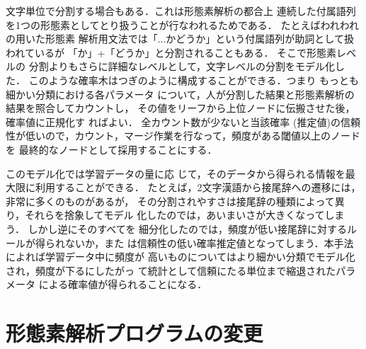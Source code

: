 文字単位で分割する場合もある．これは形態素解析の都合上
連続した付属語列を1つの形態素としてとり扱うことが行なわれるためである．
たとえばわれわれの用いた形態素
解析用文法では「...かどうか」という付属語列が助詞として扱われているが
「か」+「どうか」と分割されることもある．
そこで形態素レベルの
分割よりもさらに詳細なレベルとして，文字レベルの分割をモデル化した．
このような確率木はつぎのように構成することができる．つまり
もっとも細かい分類における各パラメータ
について，人が分割した結果と形態素解析の結果を照合してカウントし，
その値をリーフから上位ノードに伝搬させた後，確率値に正規化す
ればよい．
全カウント数が少ないと当該確率 (推定値)の信頼
性が低いので，カウント，マージ作業を行なって，頻度がある閾値以上のノードを
最終的なノードとして採用することにする．
\par
このモデル化では学習データの量に応
じて，そのデータから得られる情報を最大限に利用することができる．
たとえば，2文字漢語から接尾辞への遷移には，非常に多くのものがあるが，
その分割されやすさは接尾辞の種類によって異り，それらを捨象してモデル
化したのでは，あいまいさが大きくなってしまう．
しかし逆にそのすべてを
細分化したのでは，頻度が低い接尾辞に対するルールが得られないか，また
は信頼性の低い確率推定値となってしまう．本手法によれば学習データ中に頻度が
高いものについてはより細かい分類でモデル化され，頻度が下るにしたがっ
て統計として信頼にたる単位まで縮退されたパラメータ
による確率値が得られることになる．
\section{形態素解析プログラムの変更}
